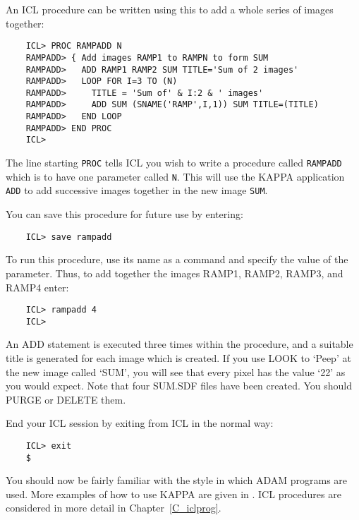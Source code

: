 An ICL procedure can be written using this to add a whole series of images
together:

\begin{small}
\begin{verbatim}
    ICL> PROC RAMPADD N
    RAMPADD> { Add images RAMP1 to RAMPN to form SUM
    RAMPADD>   ADD RAMP1 RAMP2 SUM TITLE='Sum of 2 images'
    RAMPADD>   LOOP FOR I=3 TO (N)
    RAMPADD>     TITLE = 'Sum of' & I:2 & ' images'
    RAMPADD>     ADD SUM (SNAME('RAMP',I,1)) SUM TITLE=(TITLE)
    RAMPADD>   END LOOP
    RAMPADD> END PROC
    ICL>
\end{verbatim}
\end{small}

The line starting \verb+PROC+ tells ICL you wish to write a procedure called
\verb+RAMPADD+ which is to have one parameter called \verb+N+.
This will use the KAPPA application \verb+ADD+ to
add successive
images together in the new image \verb+SUM+.

You can save this procedure for future use by entering:

\begin{small}
\begin{verbatim}
    ICL> save rampadd
\end{verbatim}
\end{small}

To run this procedure, use its name as a command and specify the value of the
parameter.
Thus, to add together the images RAMP1, RAMP2, RAMP3, and RAMP4 enter:

\begin{small}
\begin{verbatim}
    ICL> rampadd 4
    ICL>
\end{verbatim}
\end{small}

An ADD statement is executed three times within the procedure, and a suitable
title is generated for each image which is created.
If you use LOOK to `Peep' at the new image called `SUM', you will see that
every pixel has the value `22' as you would expect.
Note that four SUM.SDF files have been created.
You should PURGE or DELETE them.

End your ICL session by exiting from ICL in the normal way:

\begin{small}
\begin{verbatim}
    ICL> exit
    $
\end{verbatim}
\end{small}

You should now be fairly familiar with the style in which ADAM programs are
used.
More examples of how to use KAPPA are given in
.
ICL procedures are considered in more detail in Chapter~\ref{C_iclprog}.
